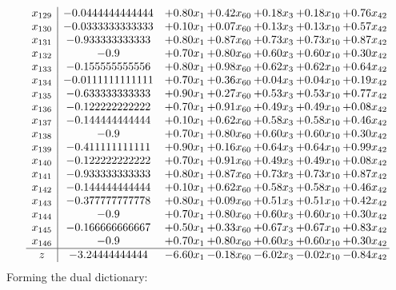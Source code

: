 \documentclass[8pt]{article}
\begin{document}
\[\begin{array}{c| c c@{\hskip 2pt} c@{\hskip 2pt} c@{\hskip 2pt} c@{\hskip 2pt} c@{\hskip 2pt} }
 x_{129}   &  -0.0444444444444 & +  0.80 x_{1} & +  0.42 x_{60} & +  0.18 x_{3} & +  0.18 x_{10} & +  0.76 x_{42}\\
 x_{130}   &  -0.0333333333333 & +  0.10 x_{1} & +  0.07 x_{60} & +  0.13 x_{3} & +  0.13 x_{10} & +  0.57 x_{42}\\
 x_{131}   &  -0.933333333333 & +  0.80 x_{1} & +  0.87 x_{60} & +  0.73 x_{3} & +  0.73 x_{10} & +  0.87 x_{42}\\
 x_{132}   &  -0.9 & +  0.70 x_{1} & +  0.80 x_{60} & +  0.60 x_{3} & +  0.60 x_{10} & +  0.30 x_{42}\\
 x_{133}   &  -0.155555555556 & +  0.80 x_{1} & +  0.98 x_{60} & +  0.62 x_{3} & +  0.62 x_{10} & +  0.64 x_{42}\\
 x_{134}   &  -0.0111111111111 & +  0.70 x_{1} & +  0.36 x_{60} & +  0.04 x_{3} & +  0.04 x_{10} & +  0.19 x_{42}\\
 x_{135}   &  -0.633333333333 & +  0.90 x_{1} & +  0.27 x_{60} & +  0.53 x_{3} & +  0.53 x_{10} & +  0.77 x_{42}\\
 x_{136}   &  -0.122222222222 & +  0.70 x_{1} & +  0.91 x_{60} & +  0.49 x_{3} & +  0.49 x_{10} & +  0.08 x_{42}\\
 x_{137}   &  -0.144444444444 & +  0.10 x_{1} & +  0.62 x_{60} & +  0.58 x_{3} & +  0.58 x_{10} & +  0.46 x_{42}\\
 x_{138}   &  -0.9 & +  0.70 x_{1} & +  0.80 x_{60} & +  0.60 x_{3} & +  0.60 x_{10} & +  0.30 x_{42}\\
 x_{139}   &  -0.411111111111 & +  0.90 x_{1} & +  0.16 x_{60} & +  0.64 x_{3} & +  0.64 x_{10} & +  0.99 x_{42}\\
 x_{140}   &  -0.122222222222 & +  0.70 x_{1} & +  0.91 x_{60} & +  0.49 x_{3} & +  0.49 x_{10} & +  0.08 x_{42}\\
 x_{141}   &  -0.933333333333 & +  0.80 x_{1} & +  0.87 x_{60} & +  0.73 x_{3} & +  0.73 x_{10} & +  0.87 x_{42}\\
 x_{142}   &  -0.144444444444 & +  0.10 x_{1} & +  0.62 x_{60} & +  0.58 x_{3} & +  0.58 x_{10} & +  0.46 x_{42}\\
 x_{143}   &  -0.377777777778 & +  0.80 x_{1} & +  0.09 x_{60} & +  0.51 x_{3} & +  0.51 x_{10} & +  0.42 x_{42}\\
 x_{144}   &  -0.9 & +  0.70 x_{1} & +  0.80 x_{60} & +  0.60 x_{3} & +  0.60 x_{10} & +  0.30 x_{42}\\
 x_{145}   &  -0.166666666667 & +  0.50 x_{1} & +  0.33 x_{60} & +  0.67 x_{3} & +  0.67 x_{10} & +  0.83 x_{42}\\
 x_{146}   &  -0.9 & +  0.70 x_{1} & +  0.80 x_{60} & +  0.60 x_{3} & +  0.60 x_{10} & +  0.30 x_{42}\\
\hline
z    &  -3.24444444444 & -6.60 x_{1} & -0.18 x_{60} & -6.02 x_{3} & -0.02 x_{10} & -0.84 x_{42}\\
\end{array}\]
Forming the dual dictionary:
\end{document}
